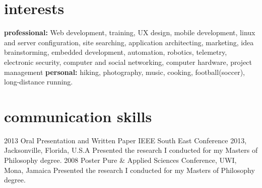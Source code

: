 \documentclass[]{friggeri-cv} %
\begin{document}
\section{interests}

\textbf{professional:} Web development, training, UX design, mobile development, linux and server configuration, site searching, application architecting, marketing, idea brainstorming, embedded development, automation, robotics, telemetry, electronic security, computer and social networking, computer hardware, project management
\textbf{personal:} hiking, photography, music, cooking, football(soccer), long-distance running.





\section{communication skills}

\begin{entrylist}
\entry
{2013}
{Oral Presentation and Written Paper}
{IEEE South East Conference 2013, Jacksonville, Florida, U.S.A}
{Presented the research I conducted for my Masters of Philosophy degree.}
\entry
{2008}
{Poster}
{Pure \& Applied Sciences Conference, UWI, Mona, Jamaica}
{Presented the research I conducted for my Masters of Philosophy degree.}
\end{entrylist}
\end{document}
